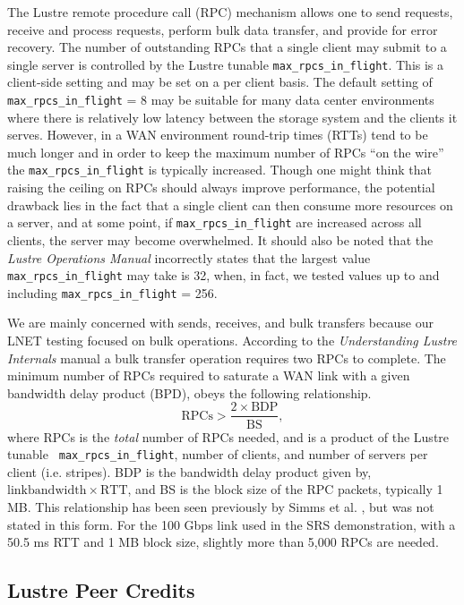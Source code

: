 \documentclass[]{sigplan-proc}
\begin{document}
The Lustre remote procedure call (RPC) mechanism allows one to send requests, receive and process requests,
perform bulk data transfer, and provide for error recovery. The number of outstanding RPCs that a single
client may submit to a single server is controlled by the Lustre tunable {\tt max\_rpcs\_in\_flight}. This is
a client-side setting and may be set on a per client basis. The default setting of {\tt max\_rpcs\_in\_flight}
= 8 may be suitable for many data center environments where there is relatively low latency between the
storage system and the clients it serves. However, in a WAN environment round-trip times (RTTs) tend to be
much longer and in order to keep the maximum number of RPCs ``on the wire'' the {\tt max\_rpcs\_in\_flight} is
typically increased. Though one might think that raising the ceiling on RPCs should always improve
performance, the potential drawback lies in the fact that a single client can then consume more resources on a
server, and at some point, if {\tt max\_rpcs\_in\_flight} are increased across all clients, the server may
become overwhelmed. It should also be noted that the {\it Lustre Operations Manual} \cite{LustreManual2012}
incorrectly states that the largest value {\tt max\_rpcs\_in\_flight} may take is 32, when, in fact, we tested
values up to and including {\tt max\_rpcs\_in\_flight} = 256.

We are mainly concerned with sends, receives, and bulk transfers because our LNET testing focused on bulk
operations. According to the {\it Understanding Lustre Internals} manual \cite{lustreint2009} a bulk transfer
operation requires two RPCs to complete. The minimum number of RPCs required to saturate a WAN link with a
given bandwidth delay product (BPD), obeys the following relationship.
\begin{equation}
\mathrm{RPCs > \frac{2\times BDP}{BS},}
\label{eq:rpcs}
\end{equation}
where RPCs is the {\it total} number of RPCs needed, and is a product of the Lustre tunable {\tt
  max\_rpcs\_in\_flight}, number of clients, and number of servers per client (i.e. stripes). BDP is the
bandwidth delay product given by, $\mathrm{link bandwidth \times RTT}$, and BS is the block size of the RPC
packets, typically 1 MB. This relationship has been seen previously by Simms et al. \cite{simms2007}, but was
not stated in this form. For the 100 Gbps link used in the SRS demonstration, with a 50.5 ms RTT and 1 MB
block size, slightly more than 5,000 RPCs are needed. 

\subsection{Lustre Peer Credits}
\end{document}
